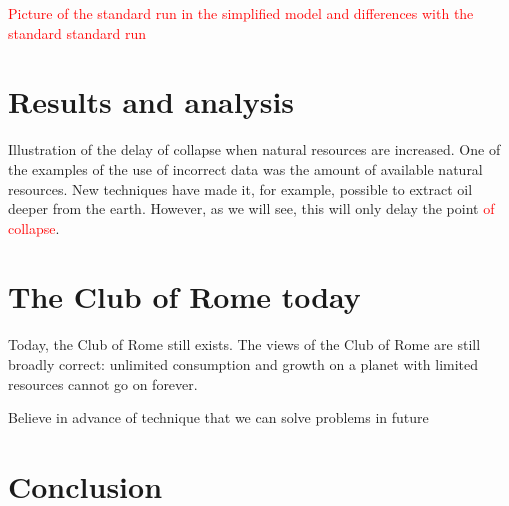 \documentclass[10pt,a4paper]{scrartcl}
\begin{document}
\textcolor{red}{Picture of the standard run in the simplified model and differences with the standard standard run}

\section*{Results and analysis}

Illustration of the delay of collapse when natural resources are increased. One of the examples of the use of incorrect data was the amount of available natural resources. New techniques have made it, for example, possible to extract oil deeper from the earth. However, as we will see, this will only delay the point \textcolor{red}{of collapse}.

\section*{The Club of Rome today}

Today, the Club of Rome still exists. The views of the Club of Rome are still broadly correct: unlimited consumption and growth on a planet with limited resources cannot go on forever.

Believe in advance of technique that we can solve problems in future

\section*{Conclusion}




\nocite{*}

\end{document}
